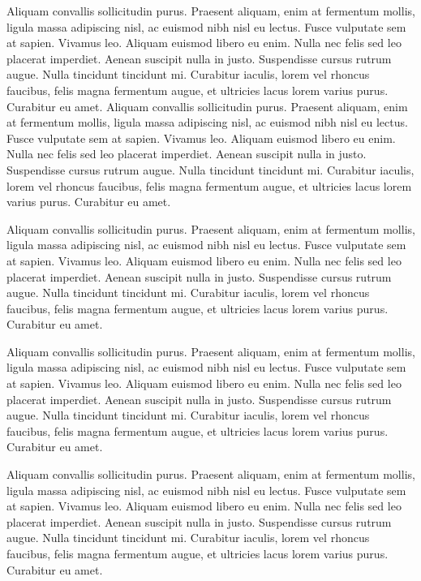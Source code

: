 Aliquam convallis sollicitudin purus. Praesent aliquam, enim at fermentum mollis, ligula massa adipiscing nisl, ac euismod nibh nisl eu lectus. Fusce vulputate sem at sapien. Vivamus leo. Aliquam euismod libero eu enim. Nulla nec felis sed leo placerat imperdiet. Aenean suscipit nulla in justo. Suspendisse cursus rutrum augue. Nulla tincidunt tincidunt mi. Curabitur iaculis, lorem vel rhoncus faucibus, felis magna fermentum augue, et ultricies lacus lorem varius purus. Curabitur eu amet. Aliquam convallis sollicitudin purus. Praesent aliquam, enim at fermentum mollis, ligula massa adipiscing nisl, ac euismod nibh nisl eu lectus. Fusce vulputate sem at sapien. Vivamus leo. Aliquam euismod libero eu enim. Nulla nec felis sed leo placerat imperdiet. Aenean suscipit nulla in justo. Suspendisse cursus rutrum augue. Nulla tincidunt tincidunt mi. Curabitur iaculis, lorem vel rhoncus faucibus, felis magna fermentum augue, et ultricies lacus lorem varius purus. Curabitur eu amet.

Aliquam convallis sollicitudin purus. Praesent aliquam, enim at fermentum mollis, ligula massa adipiscing nisl, ac euismod nibh nisl eu lectus. Fusce vulputate sem at sapien. Vivamus leo. Aliquam euismod libero eu enim. Nulla nec felis sed leo placerat imperdiet. Aenean suscipit nulla in justo. Suspendisse cursus rutrum augue. Nulla tincidunt tincidunt mi. Curabitur iaculis, lorem vel rhoncus faucibus, felis magna fermentum augue, et ultricies lacus lorem varius purus. Curabitur eu amet.

Aliquam convallis sollicitudin purus. Praesent aliquam, enim at fermentum mollis, ligula massa adipiscing nisl, ac euismod nibh nisl eu lectus. Fusce vulputate sem at sapien. Vivamus leo. Aliquam euismod libero eu enim. Nulla nec felis sed leo placerat imperdiet. Aenean suscipit nulla in justo. Suspendisse cursus rutrum augue. Nulla tincidunt tincidunt mi. Curabitur iaculis, lorem vel rhoncus faucibus, felis magna fermentum augue, et ultricies lacus lorem varius purus. Curabitur eu amet.

Aliquam convallis sollicitudin purus. Praesent aliquam, enim at fermentum mollis, ligula massa adipiscing nisl, ac euismod nibh nisl eu lectus. Fusce vulputate sem at sapien. Vivamus leo. Aliquam euismod libero eu enim. Nulla nec felis sed leo placerat imperdiet. Aenean suscipit nulla in justo. Suspendisse cursus rutrum augue. Nulla tincidunt tincidunt mi. Curabitur iaculis, lorem vel rhoncus faucibus, felis magna fermentum augue, et ultricies lacus lorem varius purus. Curabitur eu amet.

